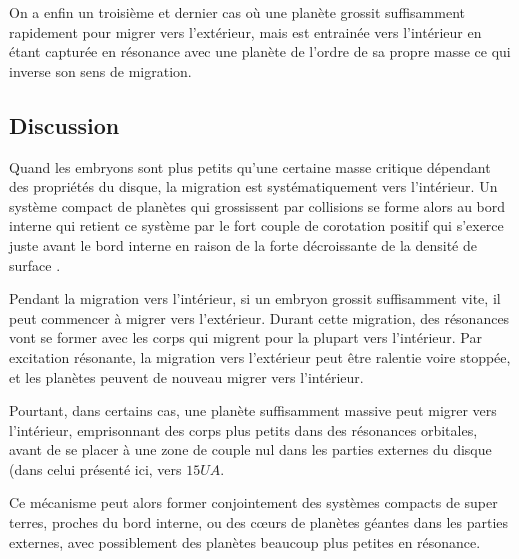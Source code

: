 On a enfin un troisième et dernier cas où une planète grossit suffisamment rapidement pour migrer vers l'extérieur, mais est entrainée vers l'intérieur en étant capturée en résonance avec une planète de l'ordre de sa propre masse ce qui inverse son sens de migration. 




\subsection{Discussion}
Quand les embryons sont plus petits qu'une certaine masse critique dépendant des propriétés du disque, la migration est systématiquement vers l'intérieur. Un système compact de planètes qui grossissent par collisions se forme alors au bord interne qui retient ce système par le fort couple de corotation positif qui s'exerce juste avant le bord interne en raison de la forte décroissante de la densité de surface \citep{masset2006disk}.

Pendant la migration vers l'intérieur, si un embryon grossit suffisamment vite, il peut commencer à migrer vers l'extérieur. Durant cette migration, des résonances vont se former avec les corps qui migrent pour la plupart vers l'intérieur. Par excitation résonante, la migration vers l'extérieur peut être ralentie voire stoppée, et les planètes peuvent de nouveau migrer vers l'intérieur. 

Pourtant, dans certains cas, une planète suffisamment massive peut migrer vers l'intérieur, emprisonnant des corps plus petits dans des résonances orbitales, avant de se placer à une zone de couple nul dans les parties externes du disque (dans celui présenté ici, vers $15\unit{UA}$.

\bigskip

Ce mécanisme peut alors former conjointement des systèmes compacts de super terres, proches du bord interne, ou des cœurs de planètes géantes dans les parties externes, avec possiblement des planètes beaucoup plus petites en résonance. 

